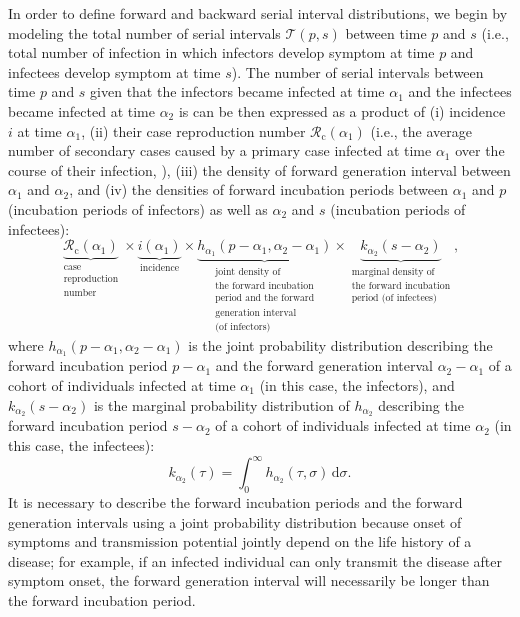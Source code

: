 \documentclass[12pt]{article}
\newcommand{\Rx}[1]{\ensuremath{{\mathcal R}_{#1}}\xspace}
\newcommand{\Rc}{\Rx{\mathrm{c}}}
\newcommand{\dd}[1]{\ensuremath{\, \mathrm{d}#1}}
\newcommand{\dsigma}{\dd{\sigma}}
\newcommand{\pt}{p} %
\newcommand{\st}{s} %
\newcommand{\total}{{\mathcal T}} %
\begin{document}
In order to define forward and backward serial interval distributions, we begin by modeling the total number of serial intervals $\total(\pt,\st)$ between time $\pt$ and $\st$ (i.e., total number of infection in which infectors develop symptom at time $\pt$ and infectees develop symptom at time $\st$).
The number of serial intervals between time $\pt$ and $\st$ given that the infectors became infected at time $\alpha_1$ and the infectees became infected at time $\alpha_2$ is can be then expressed as a product of (i) incidence $i$ at time $\alpha_1$, (ii) their case reproduction number $\Rc(\alpha_1)$ (i.e., the average number of secondary cases caused by a primary case infected at time $\alpha_1$ over the course of their infection, \cite{fraser2007estimating}), (iii) the density of forward generation interval between $\alpha_1$ and $\alpha_2$, and (iv) the densities of forward incubation periods between $\alpha_1$ and $\pt$ (incubation periods of infectors) as well as $\alpha_2$ and $\st$ (incubation periods of infectees):
\begin{equation}
\underbrace{\Rc (\alpha_1)}_{\substack{\text{case} \\ \text{reproduction} \\ \text{number}}} 
\times 
\underbrace{i(\alpha_1)}_{\text{incidence}} 
\times 
\underbrace{h_{\alpha_1}(\pt-\alpha_1, \alpha_2 - \alpha_1)}_{\substack{\text{joint density of} \\ \text{the forward incubation} \\ \text{period and the forward} \\ \text{generation interval}\\ \text{(of infectors)}}}
\times
\underbrace{k_{\alpha_2}(\st - \alpha_2)}_{\substack{\text{marginal density of} \\ \text{the forward incubation} \\ \text{period (of infectees)}}},
\end{equation}
where $h_{\alpha_1}(\pt-\alpha_1, \alpha_2 - \alpha_1)$ is the joint probability distribution describing the forward incubation period $\pt-\alpha_1$ and the forward generation interval $\alpha_2 - \alpha_1$ of a cohort of individuals infected at time $\alpha_1$ (in this case, the infectors), and $k_{\alpha_2}(\st-\alpha_2)$ is the marginal probability distribution of $h_{\alpha_2}$ describing the forward incubation period $\st-\alpha_2$ of a cohort of individuals infected at time $\alpha_2$ (in this case, the infectees):
\begin{equation}
k_{\alpha_2}(\tau) = \int_0^\infty h_{\alpha_2}(\tau, \sigma) \dsigma.
\end{equation}
It is necessary to describe the forward incubation periods and the forward generation intervals using a joint probability distribution because onset of symptoms and transmission potential jointly depend on the life history of a disease;
for example, if an infected individual can only transmit the disease after symptom onset, the forward generation interval will necessarily be longer than the forward incubation period.
\end{document}
